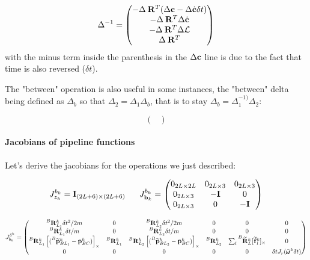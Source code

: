 \documentclass[11pt]{article}
\newcommand{\Rot}[2]{\prescript{#1}{}{\bfR}_{#2}}
\newcommand{\Rotm}[2]{\prescript{#1}{}{\widetilde{\bfR}}_{#2}}
\newcommand{\bias}{\bfb}
\newcommand{\posim}[2]{\prescript{#1}{}{\widetilde{\bfp}}_{#2}}
\newcommand{\posibar}{\bar{\bfp}}
\newcommand{\angvelbar}{\bar{\pmb{\omega}}}
\newcommand{\forcem}[2]{\prescript{#1}{}{\widetilde{\bff}}_{#2}}
\newcommand{\AM}{\mathcal{L}}
\newcommand{\COM}{\bfc}
\newcommand{\COMd}{\dot{\bfc}}
\newcommand{\Ident}{\bfI}
\begin{document}
\begin{equation}
	\Delta^{-1} =
	\begin{pmatrix}
	 - \Delta \Rot{}{}^T (\Delta\COM - \Delta\COMd \delta t)
	 \\
	 - \Delta \Rot{}{}^T \Delta \COMd
	 \\
	 - \Delta \Rot{}{}^T \Delta\AM
	 \\
	 \Delta \Rot{}{}^T
	\end{pmatrix}
\end{equation}
with the minus term inside the parenthesis in the $\Delta\COM$ line is due to the fact that time is also reversed ($\delta t$).

The "between" operation is also useful in some instances, the "between" delta being defined as $\Delta_b$ so that $\Delta_2 = \Delta_1 \Delta_b$, that is to stay $\Delta_b = \Delta^{-1)}_1 \Delta_2$:

\begin{equation}
	\begin{pmatrix}
	
	\end{pmatrix}
\end{equation}

\paragraph{Jacobians of pipeline functions}
Let's derive the jacobians for the operations we just described:

\begin{equation}
    J^{b_k}_{z_k} = \Ident_{(2L+6)\times (2L+6)}
    ~~~~~
    J^{b_k}_{\bias_k} =
    \begin{pmatrix}
    0_{2L\times 2L} & 0_{2L\times 3} & 0_{2L\times 3}
    \\
    0_{2L\times 3} & -\Ident & 0
    \\
    0_{2L\times 3} & 0 & -\Ident
    \end{pmatrix}
\end{equation}

\begin{equation}
J^{\delta ^k}_{b_k} =
\begin{pmatrix}
    \Rot{B}{L_1}^k \delta t^2/2m & 0 & \Rot{B}{L_2}^k \delta t^2/2m & 0 & 0 & 0 
    \\
    \Rot{B}{L_1}^k \delta t/m & 0 & \Rot{B}{L_2}^k \delta t/m & 0 & 0 & 0  
    \\
    \Rot{B}{L_1}^k\left[(\posim{B}{BL_1}^k - \posibar_{BC}^k) \right]_{\times} & \Rot{B}{L_1}^k & \Rot{B}{L_2}^k\left[(\posim{B}{BL_2}^k - \posibar_{BC}^k) \right]_{\times} & \Rot{B}{L_2}^k & \sum_l \Rotm{B}{L}^k [\forcem{}{l}^k]_{\times} & 0 
    \\
    0 & 0 & 0 & 0 & 0 & \delta t J_r (\angvelbar^k \delta t)
\end{pmatrix}
\end{equation}
\end{document}
